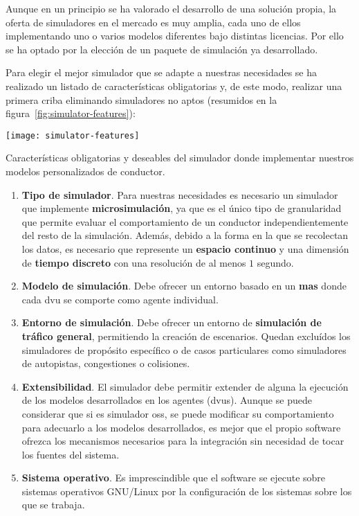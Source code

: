 Aunque en un principio se ha valorado el desarrollo de una solución propia, la oferta de simuladores en el mercado es muy amplia, cada uno de ellos implementando uno o varios modelos diferentes bajo distintas licencias. Por ello se ha optado por la elección de un paquete de simulación ya desarrollado.


Para elegir el mejor simulador que se adapte a nuestras necesidades se ha realizado un listado de características obligatorias y, de este modo, realizar una primera criba eliminando simuladores no aptos (resumidos en la figura~\ref{fig:simulator-features}):

\begin{marginfigure}
	\centering
	\texttt{[image: simulator-features]}
	\caption[Características obligatorias y deseables del simulador a elegir]{Características obligatorias y deseables del simulador donde implementar nuestros modelos personalizados de conductor.}
	\label{fig:simulator-features}
\end{marginfigure}

\begin{enumerate}
	\item \textbf{Tipo de simulador}. Para nuestras necesidades es necesario un simulador que implemente \textbf{microsimulación}, ya que es el único tipo de granularidad que permite evaluar el comportamiento de un conductor independientemente del resto de la simulación. Además, debido a la forma en la que se recolectan los datos, es necesario que represente un \textbf{espacio continuo} y una dimensión de \textbf{tiempo discreto} con una resolución de al menos $1$ segundo.
	\item \textbf{Modelo de simulación}. Debe ofrecer un entorno basado en un \textbf{\gls{mas}} donde cada \gls{dvu} se comporte como agente individual.
	\item \textbf{Entorno de simulación}. Debe ofrecer un entorno de \textbf{simulación de tráfico general}, permitiendo la creación de escenarios. Quedan excluídos los simuladores de propósito específico o de casos particulares como simuladores de autopistas, congestiones o colisiones.
	\item \textbf{Extensibilidad}. El simulador debe permitir extender de alguna la ejecución de los modelos desarrollados en los agentes (\glspl{dvu}). Aunque se puede considerar que si es simulador \gls{oss}, se puede modificar su comportamiento para adecuarlo a los modelos desarrollados, es mejor que el propio software ofrezca los mecanismos necesarios para la integración sin necesidad de tocar los fuentes del sistema.
	\item \textbf{Sistema operativo}. Es imprescindible que el software se ejecute sobre sistemas operativos GNU/Linux por la configuración de los sistemas sobre los que se trabaja.
\end{enumerate}

